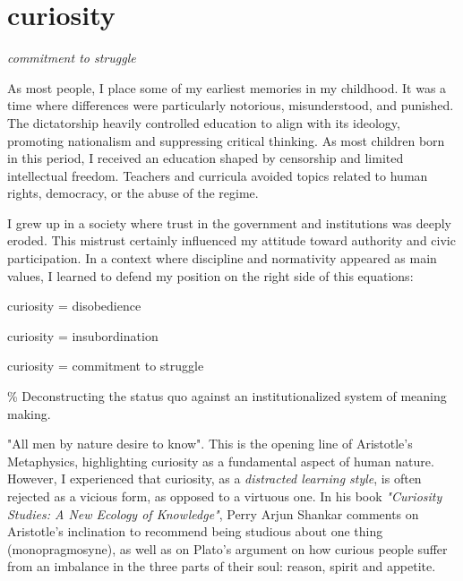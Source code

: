 \chapter*{curiosity}
\begin{center}
\vspace{2cm}
\begin{flushright}
\large
\textit{commitment to struggle}
\end{flushright}
\vspace*{\fill}
\end{center}
\normalsize

\newpage  %
As most people, I place some of my earliest memories in my childhood. It was a time where differences were particularly notorious, misunderstood, and punished. The dictatorship heavily controlled education to align with its ideology, promoting nationalism and suppressing critical thinking. As most children born in this period, I received an education shaped by censorship and limited intellectual freedom. Teachers and curricula avoided topics related to human rights, democracy, or the abuse of the regime. 

I grew up in a society where trust in the government and institutions was deeply eroded. This mistrust certainly influenced my attitude toward authority and civic participation. In a context where discipline and normativity appeared as main values, I learned to defend my position on the right side of this equations: 

curiosity = disobedience

curiosity = insubordination

curiosity = commitment to struggle 

{\scriptsize \textcolor{comment}{\%  Deconstructing the status quo against an institutionalized system of meaning making.}}

"All men by nature desire to know". This is the opening line of Aristotle's Metaphysics, highlighting curiosity as a fundamental aspect of human nature.  However, I experienced that curiosity, as a \textit{distracted learning style}, is often rejected as a vicious form, as opposed to a virtuous one. In his book \textit{"Curiosity Studies: A New Ecology of Knowledge"}, Perry Arjun Shankar comments on Aristotle's inclination to recommend being studious about one thing (monopragmosyne), as well as on Plato's argument on how curious people suffer from an imbalance in the three parts of their soul: reason, spirit and appetite. \citep{perry2020}

